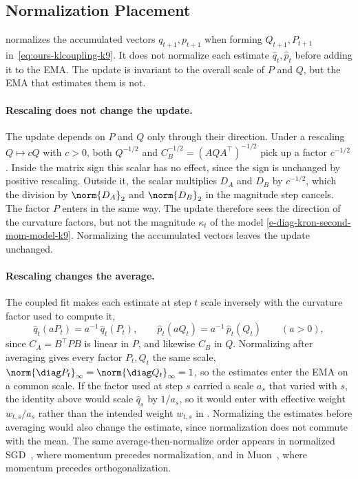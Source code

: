 \subsection{Normalization Placement}
\label{sec:scale-placement-k9}

\methodname{} normalizes the accumulated vectors $q_{t+1},p_{t+1}$ when
forming $Q_{t+1},P_{t+1}$ in~\eqref{eq:ours-klcoupling-k9}. It does not
normalize each estimate $\hat{q}_t,\hat{p}_t$ before adding it to
the EMA. The update is invariant to the overall scale of $P$ and $Q$, but
the EMA that estimates them is not.

\paragraph{Rescaling does not change the update.}
The update depends on $P$ and $Q$ only through their direction. Under a
rescaling $Q\mapsto cQ$ with $c>0$, both $Q^{-1/2}$ and
$C_B^{-1/2}=(AQA^\top)^{-1/2}$ pick up a factor $c^{-1/2}$. Inside the
matrix sign this scalar has no effect, since the sign is unchanged by
positive rescaling. Outside it, the scalar multiplies $D_A$ and $D_B$ by
$c^{-1/2}$, which the division by $\norm{D_A}_2$ and
$\norm{D_B}_2$ in the magnitude step cancels. The factor $P$ enters in
the same way. The update therefore sees the direction of the curvature
factors, but not the magnitude $\kappa_t$ of the model
\eqref{e-diag-kron-second-mom-model-k9}. Normalizing the accumulated
vectors leaves the update unchanged.

\paragraph{Rescaling changes the average.}
The coupled fit makes each estimate at step $t$ scale inversely with the
curvature factor used to compute it,
\[
  \hat{q}_t(aP_t)=a^{-1}\,\hat{q}_t(P_t),
  \qquad
  \hat{p}_t(aQ_t)=a^{-1}\,\hat{p}_t(Q_t)
  \qquad(a>0),
\]
since $C_A=B^\top PB$ is linear in $P$, and likewise $C_B$ in $Q$.
Normalizing after averaging gives every factor $P_t,Q_t$ the same scale,
$\norm{\diag P_t}_\infty=\norm{\diag Q_t}_\infty=1$, so the estimates
enter the EMA on a common scale. If the factor used at step
$s$ carried a scale $a_s$ that varied with $s$, the identity above would scale
$\hat{q}_s$ by $1/a_s$, so it would enter with effective weight
$w_{t,s}/a_s$ rather than the intended weight $w_{t,s}$ in
. Normalizing the estimates before
averaging would also change the estimate, since normalization does not
commute with the mean. The same average-then-normalize order appears in
normalized SGD~\cite{cutkosky_nigt}, where momentum precedes
normalization, and in Muon~\cite{denoise_ortho}, where momentum precedes
orthogonalization.
